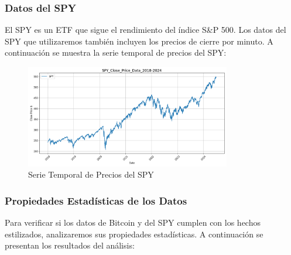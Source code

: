 \documentclass[a4paper,12pt]{report}
\begin{document}
\subsubsection{Datos del SPY}

El SPY es un ETF que sigue el rendimiento del índice S\&P 500. Los datos del SPY que utilizaremos también incluyen los precios de cierre 
por minuto. A continuación se muestra la serie temporal de precios del SPY:

\begin{figure}[H]
    \centering
    \includegraphics[width=0.8\textwidth]{figures/SPY_Close_Price_Data_2018-2024.png}
    \caption{Serie Temporal de Precios del SPY}
    \label{fig:spy-prices}
\end{figure}

\subsubsection{Propiedades Estadísticas de los Datos}

Para verificar si los datos de Bitcoin y del SPY cumplen con los hechos estilizados, analizaremos sus propiedades estadísticas. 
A continuación se presentan los resultados del análisis:

    
    
    
\end{document}
